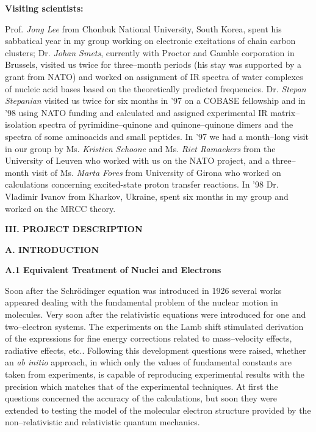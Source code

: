 \vspace{2mm}
\noindent
{\bf Visiting scientists:}

\noindent
Prof. {\em Jong Lee} from Chonbuk National University,
South Korea, spent his sabbatical year in my group 
working on electronic excitations of chain carbon clusters; 
Dr. {\em Johan Smets}, currently with Proctor and Gamble
corporation in Brussels,
visited us twice for three--month periods (his stay
was supported by a grant from NATO) and worked 
on assignment of IR spectra of water complexes of nucleic
acid bases based on the theoretically predicted 
frequencies.  
Dr. {\em Stepan Stepanian} visited us twice
for  six months  
in '97 on a COBASE fellowship 
and in '98 using  NATO funding and calculated and
assigned experimental IR matrix--isolation 
spectra of pyrimidine--quinone and quinone--quinone dimers
and the spectra of some aminoacids and small peptides.
In '97 we had a month--long visit in our group by Ms.
{\em Kristien Schoone} and Ms. {\em Riet Ramaekers} 
from the University of Leuven
who worked with us on the NATO project, and a three--month visit
of Ms. {\em Marta Fores} from University of Girona who worked
on calculations concerning excited-state proton transfer
reactions.
In '98 Dr. Vladimir Ivanov from Kharkov, Ukraine, spent six
months in my group and worked on the MRCC theory.

\vspace{4mm}
\noindent
{\bf III.  PROJECT DESCRIPTION}

\vspace{2mm}
\noindent
{\bf A. INTRODUCTION}

\vspace{2mm}
\noindent
{\bf A.1 Equivalent Treatment of Nuclei and Electrons}



Soon after the Schr\"{o}dinger equation was introduced in 1926
several works appeared dealing with the fundamental problem of the
nuclear motion in molecules. 
Very soon after the relativistic equations were introduced
for one and two--electron systems.
The experiments
on the Lamb shift stimulated derivation of the expressions
for fine energy corrections related to mass--velocity effects,
radiative effects, etc.. 
Following this development questions were raised, whether an
{\it ab initio} approach, in which only the values of
fundamental constants are taken from experiments, is capable
of reproducing experimental results with the precision
which matches that of the experimental techniques. At first
the questions concerned
the accuracy of the calculations, but soon they were extended
to testing the model of the molecular electron structure
provided by the non--relativistic and relativistic quantum mechanics.


